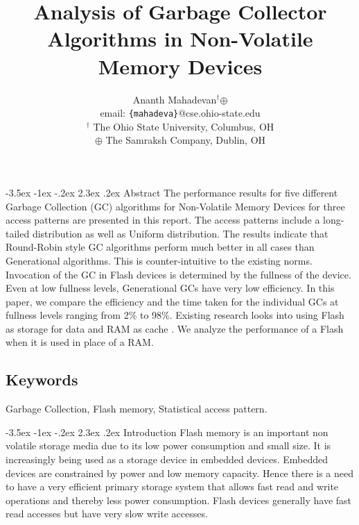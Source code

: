 \documentclass[11pt]{report} %
\title{Analysis of Garbage Collector Algorithms in Non-Volatile Memory Devices}
\author{{Ananth Mahadevan$^\dagger$$\oplus$}\\
email: {\texttt{\{mahadeva\}}}@cse.ohio-state.edu\\
$^\dagger$ The Ohio State University, Columbus, OH \\
$\oplus$ The Samraksh Company, Dublin, OH \\
}
\begin{document}
\maketitle

\makeatletter
\renewcommand\section{\@startsection {section}{1}{\z@}%
    {-3.5ex \@plus -1ex \@minus -.2ex}%
    {2.3ex \@plus.2ex}%
    {\normalfont\large\bfseries}}
\makeatother

\section{Abstract}
	The performance results for five different Garbage Collection (GC) algorithms for Non-Volatile Memory Devices for three access patterns are presented in this report. The access patterns include a long-tailed distribution as well as Uniform distribution. The results indicate that Round-Robin style GC algorithms perform much better in all cases than Generational algorithms. This is counter-intuitive to the existing norms. Invocation of the GC in Flash devices is determined by the fullness of the device. Even at low fullness levels, Generational GCs have very low efficiency. In this paper, we compare the efficiency and the time taken for the individual GCs at fullness levels ranging from 2\% to 98\%.  Existing research looks into using Flash as storage for data and RAM as cache \cite{Gupta09, Budilovsky11, Tjioe12}. We analyze the performance of a Flash when it is used in place of a RAM.

\subsection*{Keywords}
	Garbage Collection, Flash memory, Statistical access pattern.

\section{Introduction}
	Flash memory is an important non volatile storage media due to its low power consumption and small size. It is increasingly being used as a storage device in embedded devices. Embedded devices are constrained by power and low memory capacity. Hence there is a need to have a very efficient primary storage system that allows fast read and write operations and thereby less power consumption. Flash devices generally have fast read accesses but have very slow write accesses. \\
\end{document}
